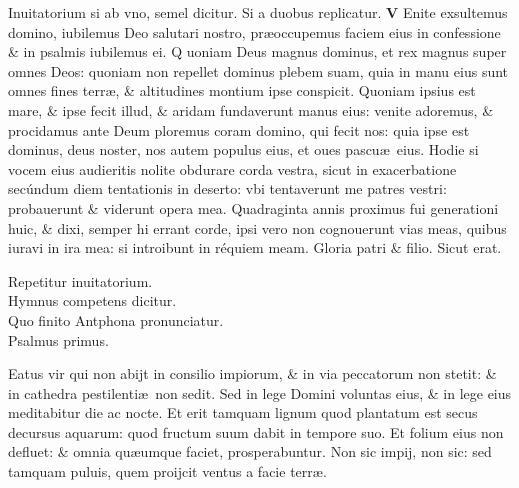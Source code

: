 \documentclass[a5paper,10pt]{book}
\def\ae{æ}
\begin{document}
\begin{multicols*}{2}
\newline
\color{red} Inuitatorium si ab vno, semel dicitur. Si a duobus replicatur. \color{black}
\lettrine[lines=2]{\bfseries \color{red} V}{}
Enite exsultemus domino, iubilemus Deo salutari nostro, pr\ae occupemus faciem eius in confessione \& in psalmis iubilemus ei.
\newline
\color{red} Q\color{black}
uoniam Deus magnus dominus, et rex magnus super omnes %
Deos: quoniam non repellet dominus plebem suam, quia in manu eius sunt omnes fines terr\ae , \& altitudines montium ipse conspicit.
\newline
\color{red} Q\color{black}uoniam ipsius est mare, \& ipse fecit illud, \& aridam fundaverunt manus eius: venite adoremus, \& procidamus ante Deum ploremus coram domino, qui fecit nos: quia ipse est dominus, deus noster, nos autem populus eius, et oues pascu\ae \ eius.
\newline
\color{red} H\color{black}odie si vocem eius audieritis nolite obdurare corda vestra, sicut in exacerbatione secúndum diem tentationis in deserto: vbi tentaverunt me patres vestri: probauerunt \& viderunt opera mea.
\newline
\color{red} Q\color{black}uadraginta annis proximus fui generationi huic, \& dixi, semper hi errant corde, ipsi vero non cognouerunt vias meas, quibus iuravi in ira mea: si introibunt in réquiem meam.
\newline
\color{red} G\color{black}loria patri \& filio. Sicut erat.
\vspace{-1em}
\begin{center} \color{red}
Repetitur inuitatorium.\\
Hymnus competens dicitur.\\
Quo finito Antphona pronunciatur.\\
Psalmus primus.
\end{center}
\vspace{-1em}
Eatus vir qui non abijt in consilio impiorum, \& in via peccatorum non stetit: \& in cathedra pestilenti\ae \ non sedit.
\newline \color{red} S\color{black}ed in lege Domini voluntas eius, \& in lege eius meditabitur die ac nocte.
\newline \color{red} E\color{black}t erit tamquam lignum quod plantatum est secus decursus aquarum: quod fructum suum dabit in tempore suo.
\newline \color{red} E\color{black}t folium eius non defluet: \& omnia qu\ae umque %
faciet, prosperabuntur.
\newline \color{red} N\color{black}on sic impij, non sic: sed tamquam puluis, quem proijcit ventus a facie terr\ae .

\end{multicols*}
\end{document}
